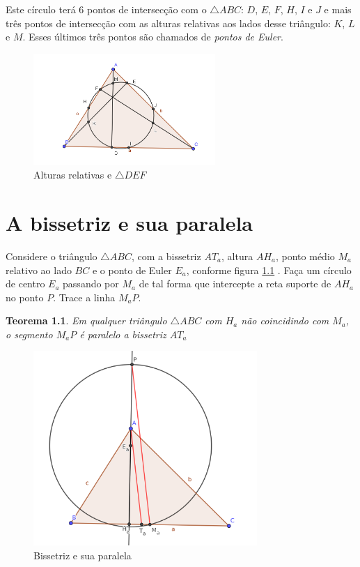 \documentclass[12pt, openright, a4paper, brazil, openany, oneside]{abntex2}
\newtheorem{teo}{Teorema}
\begin{document}
Este círculo terá 6 pontos de intersecção com o $\triangle ABC$: $D$, $E$, $F$, $H$, $I$ e $J$ e mais três pontos de intersecção com as alturas relativas aos lados desse triângulo: $K$, $L$ e $M$. Esses últimos três pontos são chamados de \textit{pontos de Euler}.

\begin{figure}[h]

    \center

    \includegraphics[width=6.9cm]{triangulo4.png}
    \caption{Alturas relativas e $\triangle DEF$ \label{tria4}}
    
\end{figure}

\chapter{A bissetriz e sua paralela}

Considere o triângulo $\triangle ABC$, com a bissetriz $AT_a$, altura $AH_a$, ponto médio $M_a$ relativo ao lado $BC$ e o ponto de Euler $E_a$, conforme figura \ref{triateo} . Faça um círculo de centro $E_a$ passando por $M_a$ de tal forma que intercepte a reta suporte de $AH_a$ no ponto $P$. Trace a linha $M_{a}P$.

\begin{teo}\label{teo1}
	Em qualquer triângulo $\triangle ABC$ com $H_a$ não coincidindo com $M_a$, o segmento $M_{a}P$ é paralelo a bissetriz $AT_a$
\end{teo}

\begin{figure}[h]
	
	\center
	
	\includegraphics[width=8.5cm]{trianguloteo.png}
	\caption{Bissetriz e sua paralela \label{triateo}}
	
\end{figure}
\end{document}
